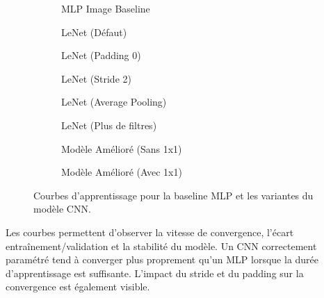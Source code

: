 \begin{figure}[H]
    \centering
    \begin{subfigure}[b]{0.48\textwidth}
        \caption{MLP Image Baseline}
    \end{subfigure}
    \hfill
    \begin{subfigure}[b]{0.48\textwidth}
        \caption{LeNet (Défaut)}
    \end{subfigure}
    
    \begin{subfigure}[b]{0.48\textwidth}
        \caption{LeNet (Padding 0)}
    \end{subfigure}
    \hfill
    \begin{subfigure}[b]{0.48\textwidth}
        \caption{LeNet (Stride 2)}
    \end{subfigure}
    
    \begin{subfigure}[b]{0.48\textwidth}
        \caption{LeNet (Average Pooling)}
    \end{subfigure}
    \hfill
    \begin{subfigure}[b]{0.48\textwidth}
        \caption{LeNet (Plus de filtres)}
    \end{subfigure}
    
    \begin{subfigure}[b]{0.48\textwidth}
        \caption{Modèle Amélioré (Sans 1x1)}
    \end{subfigure}
    \hfill
    \begin{subfigure}[b]{0.48\textwidth}
        \caption{Modèle Amélioré (Avec 1x1)}
    \end{subfigure}
    
    \caption{Courbes d’apprentissage pour la baseline MLP et les variantes du modèle CNN.}
\end{figure}
Les courbes permettent d’observer la vitesse de convergence, l’écart entraînement/validation et la stabilité du modèle. Un CNN correctement paramétré tend à converger plus proprement qu’un MLP lorsque la durée d’apprentissage est suffisante. L'impact du stride et du padding sur la convergence est également visible.

